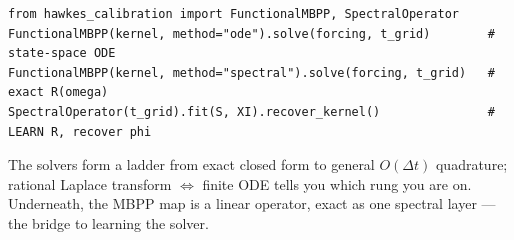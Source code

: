 \begin{lstlisting}[caption={The operator backends (from \code{operators/linear.py}).}]
from hawkes_calibration import FunctionalMBPP, SpectralOperator
FunctionalMBPP(kernel, method="ode").solve(forcing, t_grid)        # state-space ODE
FunctionalMBPP(kernel, method="spectral").solve(forcing, t_grid)   # exact R(omega)
SpectralOperator(t_grid).fit(S, XI).recover_kernel()               # LEARN R, recover phi
\end{lstlisting}

\begin{recap}
The solvers form a ladder from exact closed form to general $O(\Delta t)$
quadrature; rational Laplace transform $\Leftrightarrow$ finite ODE tells you which
rung you are on. Underneath, the MBPP map is a linear operator, exact as one
spectral layer --- the bridge to learning the solver.
\end{recap}


